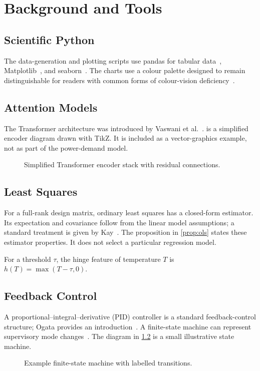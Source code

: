 \chapter{Background and Tools}\label{ch:lit}

\section{Scientific Python}
The data-generation and plotting scripts use pandas for tabular data~\cite{mckinney2010pandas}, Matplotlib~\cite{hunter2007matplotlib}, and seaborn~\cite{waskom2021seaborn}. The charts use a colour palette designed to remain distinguishable for readers with common forms of colour-vision deficiency~\cite{wong2011color}.

\section{Attention Models}
The Transformer architecture was introduced by Vaswani et al.~\cite{vaswani2017attention}.  is a simplified encoder diagram drawn with TikZ. It is included as a vector-graphics example, not as part of the power-demand model.

\begin{figure}[htbp]
  \centering
  \resizebox{0.55\textwidth}{!}{}
  \caption{Simplified Transformer encoder stack with residual connections.}
  \label{fig:transformer-thesis}
\end{figure}

\section{Least Squares}
For a full-rank design matrix, ordinary least squares has a closed-form estimator. Its expectation and covariance follow from the linear model assumptions; a standard treatment is given by Kay~\cite{kay1993estimation}. The proposition in \cref{prop:ols} states these estimator properties. It does not select a particular regression model.

\begin{definition}
For a threshold $\tau$, the hinge feature of temperature $T$ is $h(T)=\max(T-\tau,0)$.
\end{definition}

\section{Feedback Control}
A proportional--integral--derivative (PID) controller is a standard feedback-control structure; Ogata provides an introduction~\cite{ogata2010modern}. A finite-state machine can represent supervisory mode changes~\cite{hopcroft2006automata}. The diagram in \cref{fig:fsm-thesis} is a small illustrative state machine.

\begin{figure}[htbp]
  \centering
  \resizebox{0.8\textwidth}{!}{}
  \caption{Example finite-state machine with labelled transitions.}
  \label{fig:fsm-thesis}
\end{figure}
